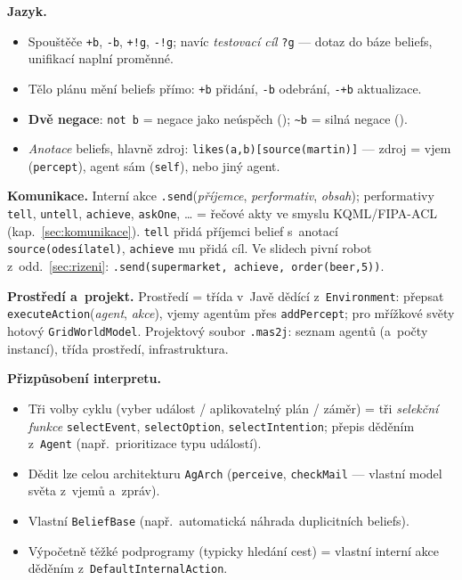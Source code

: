 \documentclass[11pt,a4paper]{article}
\theoremstyle{definition}
\begin{document}
\begin{defbox}
\textbf{Jazyk.}
\begin{itemize}
\item Spouštěče \texttt{+b}, \texttt{-b}, \texttt{+!g}, \texttt{-!g}; navíc \emph{testovací
  cíl} \texttt{?g} --- dotaz do báze beliefs, unifikací naplní proměnné.
\item Tělo plánu mění beliefs přímo: \texttt{+b} přidání, \texttt{-b} odebrání, \texttt{-+b}
  aktualizace.
\item \textbf{Dvě negace}: \texttt{not b} = negace jako neúspěch (); \texttt{\textasciitilde b} = silná negace ().
\item \emph{Anotace} beliefs, hlavně zdroj: \texttt{likes(a,b)[source(martin)]} --- zdroj =
  vjem (\texttt{percept}), agent sám (\texttt{self}), nebo jiný agent.
\end{itemize}

\textbf{Komunikace.} Interní akce \texttt{.send}(\emph{příjemce}, \emph{performativ},
\emph{obsah}); performativy \texttt{tell}, \texttt{untell}, \texttt{achieve},
\texttt{askOne}, \dots{} = řečové akty ve smyslu KQML/FIPA-ACL (kap.~\ref{sec:komunikace}).
\texttt{tell} přidá příjemci belief s~anotací \texttt{source(odesílatel)}, \texttt{achieve}
mu přidá cíl. Ve slidech pivní robot z~odd.~\ref{sec:rizeni}:
\texttt{.send(supermarket, achieve, order(beer,5))}.

\textbf{Prostředí a~projekt.} Prostředí = třída v~Javě dědící z~\texttt{Environment}:
přepsat \texttt{executeAction}(\emph{agent}, \emph{akce}), vjemy agentům přes
\texttt{addPercept}; pro mřížkové světy hotový \texttt{GridWorldModel}. Projektový soubor
\texttt{.mas2j}: seznam agentů (a~počty instancí), třída prostředí, infrastruktura.

\textbf{Přizpůsobení interpretu.}
\begin{itemize}
\item Tři volby cyklu (vyber událost / aplikovatelný plán / záměr) = tři \emph{selekční
  funkce} \texttt{selectEvent}, \texttt{selectOption}, \texttt{selectIntention}; přepis
  děděním z~\texttt{Agent} (např.\ prioritizace typu událostí).
\item Dědit lze celou architekturu \texttt{AgArch} (\texttt{perceive}, \texttt{checkMail}
  --- vlastní model světa z~vjemů a~zpráv).
\item Vlastní \texttt{BeliefBase} (např.\ automatická náhrada duplicitních beliefs).
\item Výpočetně těžké podprogramy (typicky hledání cest) = vlastní interní akce děděním
  z~\texttt{DefaultInternalAction}.
\end{itemize}
\end{defbox}
\end{document}
